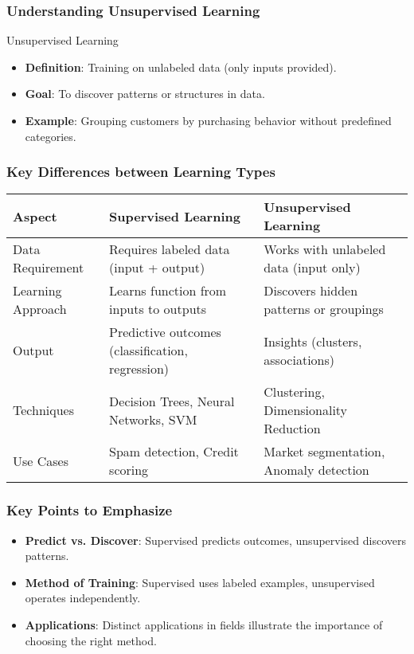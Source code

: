 \documentclass[aspectratio=169]{beamer}
\begin{document}
\begin{frame}[fragile]
    \frametitle{Understanding Unsupervised Learning}
    \begin{block}{Unsupervised Learning}
        \begin{itemize}
            \item \textbf{Definition}: Training on unlabeled data (only inputs provided).
            \item \textbf{Goal}: To discover patterns or structures in data.
            \item \textbf{Example}: Grouping customers by purchasing behavior without predefined categories.
        \end{itemize}
    \end{block}
\end{frame}

\begin{frame}[fragile]
    \frametitle{Key Differences between Learning Types}
    \begin{table}[htbp]
        \centering
        \begin{tabular}{|l|l|l|}
            \hline
            \textbf{Aspect} & \textbf{Supervised Learning} & \textbf{Unsupervised Learning} \\
            \hline
            Data Requirement & Requires labeled data (input + output) & Works with unlabeled data (input only) \\
            \hline
            Learning Approach & Learns function from inputs to outputs & Discovers hidden patterns or groupings \\
            \hline
            Output & Predictive outcomes (classification, regression) & Insights (clusters, associations) \\
            \hline
            Techniques & Decision Trees, Neural Networks, SVM & Clustering, Dimensionality Reduction \\
            \hline
            Use Cases & Spam detection, Credit scoring & Market segmentation, Anomaly detection \\
            \hline
        \end{tabular}
    \end{table}
\end{frame}

\begin{frame}[fragile]
    \frametitle{Key Points to Emphasize}
    \begin{itemize}
        \item \textbf{Predict vs. Discover}: Supervised predicts outcomes, unsupervised discovers patterns.
        \item \textbf{Method of Training}: Supervised uses labeled examples, unsupervised operates independently.
        \item \textbf{Applications}: Distinct applications in fields illustrate the importance of choosing the right method.
    \end{itemize}
\end{frame}
\end{document}
